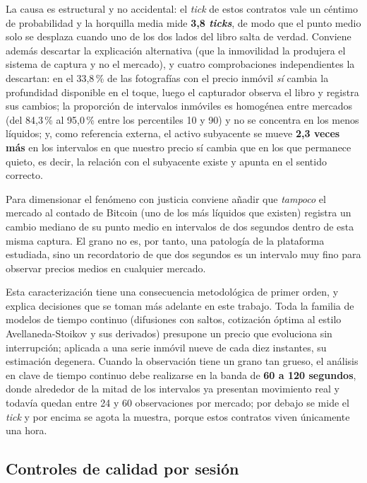 La causa es estructural y no accidental: el \emph{tick} de estos contratos vale un céntimo
de probabilidad y la horquilla media mide \textbf{3,8 \emph{ticks}}, de modo que el punto
medio solo se desplaza cuando uno de los dos lados del libro salta de verdad. Conviene
además descartar la explicación alternativa (que la inmovilidad la produjera el sistema de
captura y no el mercado), y cuatro comprobaciones independientes la descartan: en el
33,8\,\% de las fotografías con el precio inmóvil \emph{sí} cambia la profundidad
disponible en el toque, luego el capturador observa el libro y registra sus cambios; la
proporción de intervalos inmóviles es homogénea entre mercados (del 84,3\,\% al 95,0\,\%
entre los percentiles 10 y 90) y no se concentra en los menos líquidos; y, como referencia
externa, el activo subyacente se mueve \textbf{2,3 veces más} en los intervalos en que
nuestro precio sí cambia que en los que permanece quieto, es decir, la relación con el
subyacente existe y apunta en el sentido correcto.

Para dimensionar el fenómeno con justicia conviene añadir que \emph{tampoco} el mercado al
contado de Bitcoin (uno de los más líquidos que existen) registra un cambio mediano de su
punto medio en intervalos de dos segundos dentro de esta misma captura. El grano no es,
por tanto, una patología de la plataforma estudiada, sino un recordatorio de que dos
segundos es un intervalo muy fino para observar precios medios en cualquier mercado.

Esta caracterización tiene una consecuencia metodológica de primer orden, y explica
decisiones que se toman más adelante en este trabajo. Toda la familia de modelos de tiempo
continuo (difusiones con saltos, cotización óptima al estilo Avellaneda-Stoikov y sus
derivados) presupone un precio que evoluciona sin interrupción; aplicada a una serie
inmóvil nueve de cada diez instantes, su estimación degenera. Cuando la observación tiene
un grano tan grueso, el análisis en clave de tiempo continuo debe realizarse en la banda de
\textbf{60 a 120 segundos}, donde alrededor de la mitad de los intervalos ya presentan
movimiento real y todavía quedan entre 24 y 60 observaciones por mercado; por debajo se
mide el \emph{tick} y por encima se agota la muestra, porque estos contratos viven
únicamente una hora.

\subsection{Controles de calidad por sesión}
\label{sec::qa}

